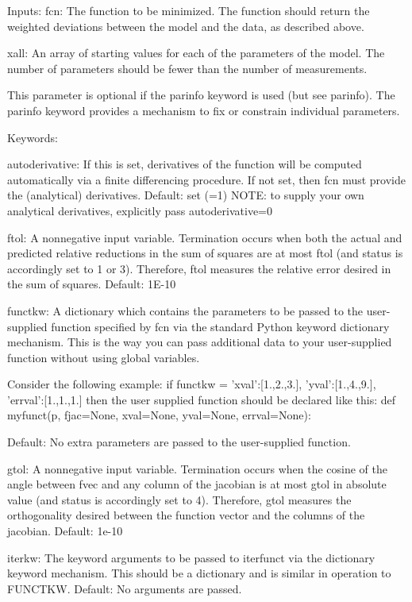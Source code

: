 \begin{DoxyVerb}  Inputs:
    fcn:
       The function to be minimized.  The function should return the weighted
       deviations between the model and the data, as described above.

    xall:
       An array of starting values for each of the parameters of the model.
       The number of parameters should be fewer than the number of measurements.

       This parameter is optional if the parinfo keyword is used (but see
       parinfo).  The parinfo keyword provides a mechanism to fix or constrain
       individual parameters.

  Keywords:

     autoderivative:
If this is set, derivatives of the function will be computed
automatically via a finite differencing procedure.  If not set, then
fcn must provide the (analytical) derivatives.
   Default: set (=1)
   NOTE: to supply your own analytical derivatives,
 explicitly pass autoderivative=0

     ftol:
A nonnegative input variable. Termination occurs when both the actual
and predicted relative reductions in the sum of squares are at most
ftol (and status is accordingly set to 1 or 3).  Therefore, ftol
measures the relative error desired in the sum of squares.
   Default: 1E-10

     functkw:
A dictionary which contains the parameters to be passed to the
user-supplied function specified by fcn via the standard Python
keyword dictionary mechanism.  This is the way you can pass additional
data to your user-supplied function without using global variables.

Consider the following example:
   if functkw = {'xval':[1.,2.,3.], 'yval':[1.,4.,9.],
         'errval':[1.,1.,1.] }
then the user supplied function should be declared like this:
   def myfunct(p, fjac=None, xval=None, yval=None, errval=None):

Default: {}   No extra parameters are passed to the user-supplied
      function.

     gtol:
A nonnegative input variable. Termination occurs when the cosine of
the angle between fvec and any column of the jacobian is at most gtol
in absolute value (and status is accordingly set to 4). Therefore,
gtol measures the orthogonality desired between the function vector
and the columns of the jacobian.
   Default: 1e-10

     iterkw:
The keyword arguments to be passed to iterfunct via the dictionary
keyword mechanism.  This should be a dictionary and is similar in
operation to FUNCTKW.
   Default: {}  No arguments are passed.


\end{DoxyVerb}
